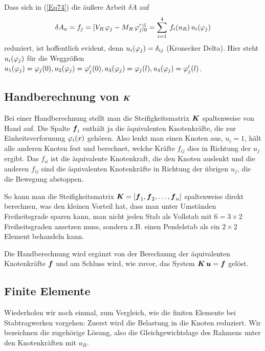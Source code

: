 {{\begin{remark}
Dass sich in (\ref{Eq74}) die \"{a}u{\ss}ere Arbeit $\delta A$ auf
\begin{align}
\delta A_a = f_j = [V_R\,\varphi_j - M_R\,\varphi_j']_0^l = \sum_{i = 1}^4\,f_i(u_R)\,u_i(\varphi_j)
\end{align}
reduziert, ist hoffentlich evident, denn $u_i(\varphi_j) = \delta_{ij}$ (Kronecker Delta). Hier steht $u_i(\varphi_j) $ f\"{u}r die Weggr\"{o}{\ss}en $u_1(\varphi_j) = \varphi_j(0), u_2(\varphi_j) = \varphi_j'(0), u_3(\varphi_j) = \varphi_j(l), u_4(\varphi_j) = \varphi_j'(l)$.
\end{remark}
\vspace{-0.5cm}
{\textcolor{sectionTitleBlue}{\subsection{Handberechnung von $\mbox{\boldmath $K$}$}}}
Bei einer Handberechnung stellt man die Steifigkeitsmatrix $\mbox{\boldmath $K$}$ spaltenweise von Hand auf. Die Spalte $\mbox{\boldmath $f$}_i$ enth\"{a}lt ja die \"{a}quivalenten Knotenkr\"{a}fte, die zur Einheitsverformung $\varphi_i(x)$ geh\"{o}ren. Also lenkt man einen Knoten aus, $u_i = 1$, h\"{a}lt alle anderen Knoten fest und berechnet, welche Kr\"{a}fte $f_{ij}$ dies in Richtung der $u_j$ ergibt. Das $f_{ii}$ ist die \"{a}quivalente Knotenkraft, die den Knoten auslenkt und die anderen $f_{ij}$ sind die \"{a}quivalenten Knotenkr\"{a}fte in Richtung der \"{u}brigen $u_j$, die die Bewegung abstoppen.

So kann man die Steifigkeitsmatrix $\mbox{\boldmath $K$} = [\mbox{\boldmath $f$}_1, \mbox{\boldmath $f$}_2, \ldots , \mbox{\boldmath $f$}_n]$ spaltenweise direkt berechnen, was den kleinen Vorteil hat, dass man unter Umst\"{a}nden Freiheitsgrade sparen kann, man nicht jeden Stab als Vollstab mit $6 = 3 \times 2$ Freiheitsgraden ansetzen muss, sondern z.B. einen Pendelstab als ein $2 \times 2$ Element behandeln kann.

Die Handberechnung wird erg\"{a}nzt von der Berechnung der \"{a}quivalenten Knotenkr\"{a}fte $\mbox{\boldmath $f$}$ und am Schluss wird, wie zuvor, das System $\mbox{\boldmath $K$}\,\mbox{\boldmath $u$} = \mbox{\boldmath $f$}$ gel\"{o}st.

{\textcolor{sectionTitleBlue}{\subsection{Finite Elemente}}}

Wiederholen wir noch einmal, zum Vergleich, wie die finiten Elemente bei Stabtragwerken vorgehen: Zuerst wird die Belastung in die Knoten reduziert. Wir bezeichnen die zugeh\"{o}rige L\"{o}sung, also die Gleichgewichtslage des Rahmens unter den Knotenkr\"{a}ften mit $u_R$.

}}
